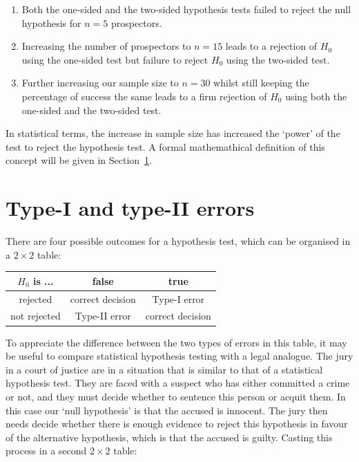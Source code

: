 \begin{enumerate}
  \item Both the one-sided and the two-sided hypothesis tests failed
    to reject the null hypothesis for $n=5$ prospectors.
  \item Increasing the number of prospectors to $n=15$ leads to a
    rejection of $H_0$ using the one-sided test but failure to reject
    $H_0$ using the two-sided test.
  \item Further increasing our sample size to $n=30$ whilst still
    keeping the percentage of success the same leads to a firm
    rejection of $H_0$ using both the one-sided and the two-sided
    test.
\end{enumerate}

In statistical terms, the increase in sample size has increased the
`power' of the test to reject the hypothesis test. A formal
mathemathical definition of this concept will be given in
Section~\ref{sec:typeI&II}.

\section{Type-I and type-II errors}
\label{sec:typeI&II}

There are four possible outcomes for a hypothesis test, which can be
organised in a ${2}\times{2}$ table:

\begin{center}
\begin{tabular}{c|cc}
  $H_0$ is ... & false & true \\ \hline
  rejected & correct decision & Type-I error \\
  not rejected & Type-II error & correct decision
\end{tabular}
\end{center}

To appreciate the difference between the two types of errors in this
table, it may be useful to compare statistical hypothesis testing with
a legal analogue. The jury in a court of justice are in a situation
that is similar to that of a statistical hypothesis test. They are
faced with a suspect who has either committed a crime or not, and they
must decide whether to sentence this person or acquit them.  In this
case our `null hypothesis' is that the accused is innocent.  The jury
then needs decide whether there is enough evidence to reject this
hypothesis in favour of the alternative hypothesis, which is that the
accused is guilty. Casting this process in a second ${2}\times{2}$
table:

